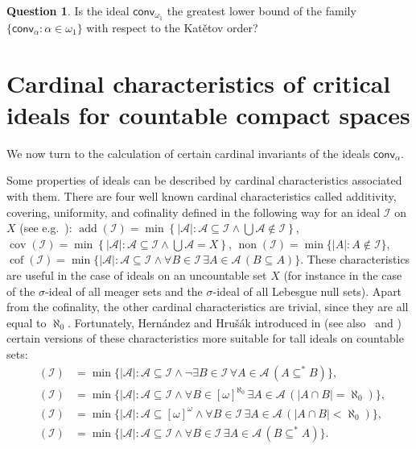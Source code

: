 \documentclass{amsart}
\theoremstyle{plain}
\theoremstyle{definition}
\newtheorem{question}[theorem]{Question}
\theoremstyle{remark}
\newcommand{\cA}{\mathcal{A}}
\newcommand{\cI}{\mathcal{I}}
\newcommand{\I}{\cI}
\DeclareMathOperator{\add}{add}
\DeclareMathOperator{\non}{non}
\DeclareMathOperator{\cov}{cov}
\DeclareMathOperator{\cof}{cof}
\DeclareMathOperator{\adds}{\add^*}
\DeclareMathOperator{\nons}{\non^*}
\DeclareMathOperator{\covs}{\cov^*}
\DeclareMathOperator{\cofs}{\cof^*}
\newcommand{\conv}{\mathsf{conv}}
\renewcommand{\subset}{\subseteq}
\begin{document}
\begin{question}
Is the ideal $\conv_{\omega_1}$
the greatest lower bound of the family 
$\{\conv_\alpha : \alpha\in\omega_1\}$
with respect to the Kat\v{e}tov order?
\end{question}










\section{Cardinal characteristics of critical ideals for countable compact spaces}
\label{subsec:cardinal-characteristics}
We now turn to the calculation of certain cardinal invariants of the ideals $\conv_\alpha$.

Some properties of ideals can be described by cardinal characteristics associated with them. There are four well known cardinal characteristics called additivity, covering, uniformity, and cofinality defined in the following way
for an ideal $\I$ on $X$ (see e.g.~\cite{MR1350295}):
$\add(\I) =\min\left\{|\cA|:\cA\subseteq\I\land \bigcup\cA\notin\I\right\}$,
$\cov(\I)  = \min\left\{|\cA|: \cA\subseteq\I\land \bigcup\cA=X\right\}$, 
$\non(\I)  = \min\{|A|:A\notin \I\}$, 
$\cof(\I)  =\min\{|\cA|:\cA\subseteq\I\land \forall B\in\I \, \exists A\in\cA \, (B\subseteq A)\}$.
These  characteristics are useful in the case of ideals on an uncountable set $X$ (for instance in the case of the $\sigma$-ideal  of all meager sets and the $\sigma$-ideal of all Lebesgue null sets). 
Apart from the cofinality, the other cardinal
characteristics are trivial, since they are all equal to $\aleph_0$.
Fortunately, 
Hern\'{a}ndez and Hru\v{s}\'{a}k
introduced in \cite{MR2319159} (see also~\cite{MR1686797} and \cite{MR2777744}) certain versions of these characteristics more suitable for tall ideals on countable sets:
\begin{equation*}
\begin{split}
\adds(\I) & =\min\{|\cA|:\cA\subseteq\I\land \neg \exists B\in\I \, \forall A\in\cA \, (A\subset^* B)\}, \\
\covs(\I)  & = \min\{|\cA|: \cA\subseteq\I\land \forall B\in [\omega]^{\aleph_0} \, \exists A\in\cA \, (|A\cap B|=\aleph_0)\},\\
\nons(\I) & = \min\{|\cA|:\cA\subseteq [\omega]^\omega\land \forall B\in\I \, \exists A\in\cA \, (|A\cap B|<\aleph_0)\}, \\
\cofs(\I) & =\min\{|\cA|:\cA\subseteq\I\land \forall B\in\I \, \exists A\in\cA \, (B\subset^* A)\}.
\end{split}
\end{equation*}
\end{document}
